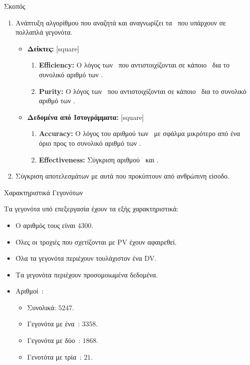 \begin{frame}{Σκοπός}

	\begin{enumerate}
		\item Ανάπτυξη αλγορίθμου που αναζητά και αναγνωρίζει τα \dvtrue\ που υπάρχουν σε πολλαπλά γεγονότα.	
		\begin{itemize}
			\item \textbf{Δείκτες:}
				[square]
				\begin{enumerate}
					\item \textbf{Efficiency:} Ο λόγος των \dvtrue\ που αντιστοιχίζονται σε κάποιο \dvreco\ δια το συνολικό αριθμό των \dvtrue.
					\item \textbf{Purity:} Ο λόγος των \dvreco\ που αντιστοιχίζονται σε κάποιο \dvtrue\ δια το συνολικό αριθμό των \dvreco.
				\end{enumerate}
			\item \textbf{Δεδομένα από Ιστογράμματα:}	
				[square]
				\begin{enumerate}
					\item \textbf{Accuracy:} Ο λόγος του αριθμού των \dvreco\ με σφάλμα μικρότερο από ένα όριο προς το συνολικό αριθμό των \dvreco.
					\item \textbf{Effectiveness:} Σύγκριση αριθμού \dvreco\ και \dvtrue.
				\end{enumerate}
		\end{itemize}
		\item Σύγκριση αποτελεσμάτων με αυτά που προκύπτουν από ανθρώπινη είσοδο.
	\end{enumerate}

\end{frame}

\begin{frame}{Χαρακτηριστικά Γεγονότων}
	
	Τα γεγονότα υπό επεξεργασία έχουν τα εξής χαρακτηριστικά:
	\vspace{4mm}
	\begin{itemize}
		\item Ο αριθμός τους είναι $4300$.
		\item Όλες οι τροχιές που σχετίζονται με PV έχουν αφαιρεθεί.
		\item Όλα τα γεγονότα περιέχουν τουλάχιστον ένα DV.
		\item Τα γεγονότα περιέχουν προσομοιωμένα δεδομένα.
		\item Αριθμοί \dvtrue\,:
			\begin{itemize}
				\item Συνολικά: $5247$.
				\item Γεγονότα με ένα \dvtrue\,: $3358$.
				\item Γεγονότα με δύο \dvtrue\,: $1868$.
				\item Γενοτότα με τρία \dvtrue\,: $21$.
			\end{itemize}
	\end{itemize}
	
\end{frame}
